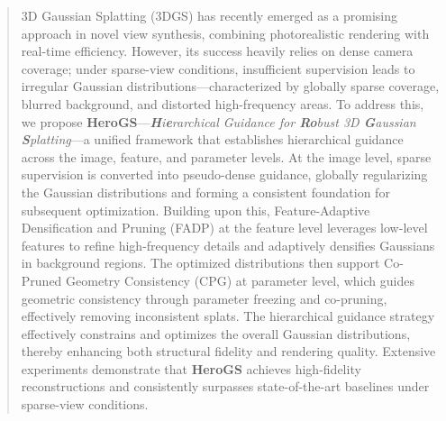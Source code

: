 \begin{abstract}
3D Gaussian Splatting (3DGS) has recently emerged as a promising approach in novel view synthesis, combining photorealistic rendering with real-time efficiency. However, its success heavily relies on dense camera coverage; under sparse-view conditions, insufficient supervision leads to irregular Gaussian distributions—characterized by globally sparse coverage, blurred background, and distorted high-frequency areas.
To address this, we propose \textbf{HeroGS}—\textit{\textbf{H}i\textbf{e}rarchical Guidance for \textbf{Ro}bust 3D \textbf{G}aussian \textbf{S}platting}—a unified framework that establishes hierarchical guidance across the image, feature, and parameter levels. 
At the image level, sparse supervision is converted into pseudo-dense guidance, globally regularizing the Gaussian distributions and forming a consistent foundation for subsequent optimization. 
Building upon this, Feature-Adaptive Densification and Pruning (FADP) at the feature level leverages low-level features to refine high-frequency details and adaptively densifies Gaussians in background regions.
The optimized distributions then support Co-Pruned Geometry Consistency (CPG) at parameter level, which guides geometric consistency through parameter freezing and  co-pruning, effectively removing inconsistent splats. 
The hierarchical guidance strategy effectively constrains and optimizes the overall Gaussian distributions, thereby enhancing both structural fidelity and rendering quality.
Extensive experiments demonstrate that \textbf{HeroGS} achieves  high-fidelity reconstructions and consistently surpasses state-of-the-art baselines under sparse-view conditions.
\end{abstract}